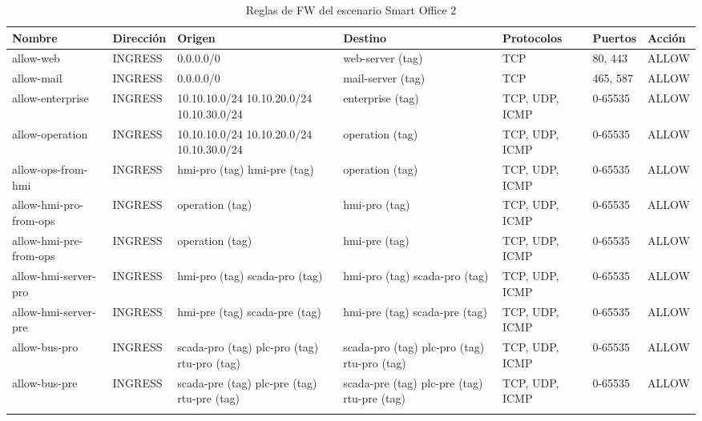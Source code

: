   \begin{table}[h]
    \begin{center}
      \footnotesize\begin{tabular}{ | m{2cm} | w{c}{1,5cm} | m{2cm} | m{2cm} | m{2cm} | w{c}{1,25cm} | w{c}{1,25cm} | }
        \hline{} \centering\textbf{Nombre} & \textbf{Dirección} & \centering\textbf{Origen} & \centering\textbf{Destino} & \centering\textbf{Protocolos} & \textbf{Puertos} & \textbf{Acción} \\ \hline
        allow-web & INGRESS & 0.0.0.0/0 & web-server (tag) & \centering TCP & 80, 443 & ALLOW  \\ \hline{}
        allow-mail & INGRESS & 0.0.0.0/0 & mail-server (tag) & \centering TCP & 465, 587 & ALLOW  \\ \hline
        allow-enterprise & INGRESS & 10.10.10.0/24 10.10.20.0/24 10.10.30.0/24 & enterprise (tag) & TCP, UDP, ICMP & 0-65535 & ALLOW \\ \hline{}
        allow-operation & INGRESS & 10.10.10.0/24 10.10.20.0/24 10.10.30.0/24 & operation (tag) & TCP, UDP, ICMP & 0-65535 & ALLOW \\ \hline
        allow-ops-from-hmi & INGRESS & hmi-pro (tag) hmi-pre (tag) & operation (tag) & TCP, UDP, ICMP & 0-65535 & ALLOW \\ \hline{}
        allow-hmi-pro-from-ops & INGRESS & operation (tag) & hmi-pro (tag) & TCP, UDP, ICMP & 0-65535 & ALLOW \\ \hline
        allow-hmi-pre-from-ops & INGRESS & operation (tag) & hmi-pre (tag) & TCP, UDP, ICMP & 0-65535 & ALLOW \\ \hline{}
        allow-hmi-server-pro & INGRESS & hmi-pro (tag) scada-pro (tag) & hmi-pro (tag) scada-pro (tag) & TCP, UDP, ICMP & 0-65535 & ALLOW \\ \hline 
        allow-hmi-server-pre & INGRESS & hmi-pre (tag) scada-pre (tag) & hmi-pre (tag) scada-pre (tag) & TCP, UDP, ICMP & 0-65535 & ALLOW \\ \hline{}
        allow-bus-pro & INGRESS & scada-pro (tag) plc-pro (tag) rtu-pro (tag) & scada-pro (tag) plc-pro (tag) rtu-pro (tag) & TCP, UDP, ICMP & 0-65535 & ALLOW \\ \hline
        allow-bus-pre & INGRESS & scada-pre (tag) plc-pre (tag) rtu-pre (tag) & scada-pre (tag) plc-pre (tag) rtu-pre (tag) & TCP, UDP, ICMP & 0-65535 & ALLOW \\ \hline{}

      \end{tabular}
      \caption{Reglas de FW del escenario Smart Office 2}
      \label{tab:fw4}
    \end{center}
  \end{table}


